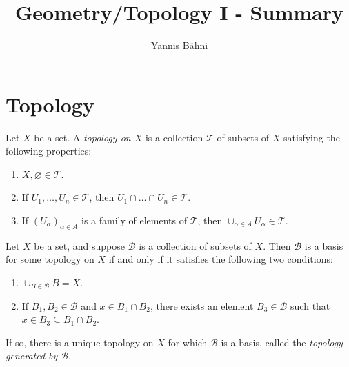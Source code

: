 


\title{Geometry/Topology I - Summary}
\author{Yannis B\"{a}hni}
\address[Yannis B\"{a}hni]{University of Zurich, R\"{a}mistrasse 71, 8006 Zurich}

\maketitle
\thispagestyle{fancy}

\tikzset{external/force remake}
\originalsectionstyle

\section{Topology}
\begin{definition}
	Let $X$ be a set. A \emph{topology on $X$} is a collection $\mathcal{T}$ of subsets of $X$ satisfying the following properties:
	
	\begin{enumerate}[label = (\roman*)]
		\item $X,\varnothing \in \mathcal{T}$.
		\item If $U_1,\dots,U_n \in \mathcal{T}$, then $U_1 \cap \dots \cap U_n \in \mathcal{T}$.
		\item If $(U_\alpha)_{\alpha \in A}$ is a family of elements of $\mathcal{T}$, then $\cup_{\alpha \in A} U_\alpha \in \mathcal{T}$.
	\end{enumerate}
\end{definition}

\vspace{1mm}

\begin{definition}
	Let $X$ be a set, and suppose $\mathcal{B}$ is a collection of subsets of $X$. Then $\mathcal{B}$ is a basis for some topology on $X$ if and only if it satisfies the following two conditions:
	\begin{enumerate}[label = (\roman*)]
		\item $\cup_{B \in \mathcal{B}} B = X$.
		\item If $B_1, B_2 \in \mathcal{B}$ and $x \in B_1 \cap B_2$, there exists an element $B_3 \in \mathcal{B}$ such that $x \in B_3 \subseteq B_1 \cap B_2$. 
	\end{enumerate}

	If so, there is a unique topology on $X$ for which $\mathcal{B}$ is a basis, called the \emph{topology generated by $\mathcal{B}$}.
\end{definition}

